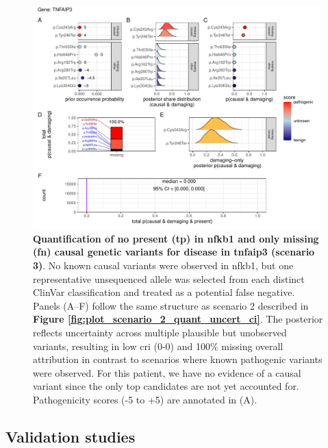 \begin{figure}[ht]
  \centering
  \includegraphics[width=0.99\textwidth]{../images/plot_scenario_3_quant_uncert_ci.pdf}
  \caption{
 \textbf{Quantification of no present (\ac{tp}) in \ac{nfkb1} and only missing (\ac{fn}) causal genetic variants for disease in \ac{tnfaip3} (scenario 3)}.
No known causal variants were observed in \ac{nfkb1}, but one representative unsequenced allele was selected from each distinct ClinVar classification and treated as a potential false negative.  
Panels (A–F) follow the same structure as scenario 2 described in \textbf{Figure \ref{fig:plot_scenario_2_quant_uncert_ci}}.  
The posterior reflects uncertainty across multiple plausible but unobserved variants, resulting in low \ac{cri} (0-0) and 100\% missing overall attribution in contrast to scenarios where known pathogenic variants were observed. For this patient, we have no evidence of a causal variant since the only top candidates are not yet accounted for.
Pathogenicity scores (-5 to +5) are annotated in (A).
  }
  \label{fig:plot_scenario_3_quant_uncert_ci}
\end{figure}


\subsection{Validation studies}

